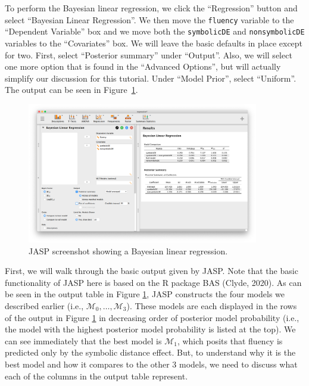 \documentclass[english,,doc,floatsintext]{apa6}
\begin{document}
To perform the Bayesian linear regression, we click the \enquote{Regression} button and select \enquote{Bayesian Linear Regression}. We then move the \texttt{fluency} variable to the \enquote{Dependent Variable} box and we move both the \texttt{symbolicDE} and \texttt{nonsymbolicDE} variables to the \enquote{Covariates} box. We will leave the basic defaults in place except for two. First, select \enquote{Posterior summary} under \enquote{Output}. Also, we will select one more option that is found in the \enquote{Advanced Options}, but will actually simplify our discussion for this tutorial. Under \enquote{Model Prior}, select \enquote{Uniform}. The output can be seen in Figure~\ref{fig:regression1}.

\begin{figure}[htbp]
\centering
\includegraphics[width=0.9\textwidth,height=\textheight]{figures/regression1.png}
\caption{\label{fig:regression1}JASP screenshot showing a Bayesian linear regression.}
\end{figure}

First, we will walk through the basic output given by JASP. Note that the basic functionality of JASP here is based on the R package BAS (Clyde, 2020). As can be seen in the output table in Figure \ref{fig:regression1}, JASP constructs the four models we described earlier (i.e., \(\mathcal{M}_0, \dots, \mathcal{M}_3\)). These models are each displayed in the rows of the output in Figure \ref{fig:regression1} in decreasing order of posterior model probability (i.e., the model with the highest posterior model probability is listed at the top). We can see immediately that the best model is \(\mathcal{M}_{1}\), which posits that fluency is predicted only by the symbolic distance effect. But, to understand why it is the best model and how it compares to the other 3 models, we need to discuss what each of the columns in the output table represent.
\end{document}
